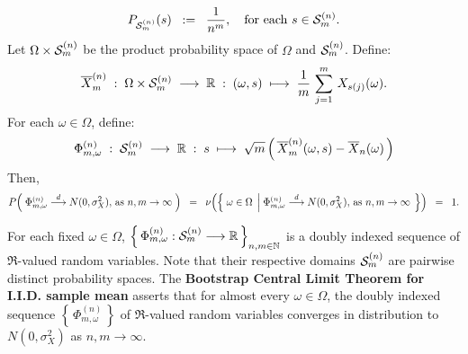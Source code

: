 \begin{theorem}
\begin{equation*}
P_{\mathcal{S}^{(n)}_{m}}(s) \;\; := \;\; \dfrac{1}{n^{m}},
\quad\textnormal{for each $s \in \mathcal{S}^{(n)}_{m}$}.
\end{equation*}
Let $\Omega \times \mathcal{S}^{(n)}_{m}$ be the product probability space of $\Omega$ and $\mathcal{S}^{(n)}_{m}$.
Define:
\begin{equation*}
\overline{X}^{(n)}_{m}
\;:\;\Omega \times \mathcal{S}^{(n)}_{m} \;\longrightarrow \; \mathbb{R}
\;:\; (\omega,s) \; \longmapsto \; \dfrac{1}{m}\,\sum^{m}_{j=1}\,X_{s(j)}(\omega).
\end{equation*}
For each $\omega \in \Omega$, define:
\begin{equation*}
\Phi^{(n)}_{m,\omega}
\;:\;
\mathcal{S}^{(n)}_{m}\;\longrightarrow\; \mathbb{R}
\;:\;
s
\;\longmapsto\;
\sqrt{m}\left(\,\overline{X}^{(n)}_{m}(\omega,s) - \overline{X}_{n}(\omega)\,\right)
\end{equation*}
Then,
\begin{equation*}
P\!\left(\;
\Phi^{(n)}_{m,\omega} \overset{d}{\longrightarrow} N(0,\sigma^{2}_{X}),\,\textnormal{as $n,m\rightarrow\infty$}
\;\right)
\;\; = \;\;
\nu\!\left(\left\{\;
\omega \in \Omega
\;\left\vert\;
\Phi^{(n)}_{m,\omega} \overset{d}{\longrightarrow} N(0,\sigma^{2}_{X}),\,\textnormal{as $n,m\rightarrow\infty$}
\right.
\;\right\}\right)
\;\; = \;\;
1.
\end{equation*}
\end{theorem}

\begin{remark}
\mbox{}\vskip 0.1cm
\noindent
For each fixed $\omega \in \Omega$,
$\left\{\,\Phi^{(n)}_{m,\omega} : \mathcal{S}^{(n)}_{m} \longrightarrow \mathbb{R}\,\right\}_{n,m\in\mathbb{N}}$
is a doubly indexed sequence of $\Re$-valued random variables.
Note that their respective domains $\mathcal{S}^{(n)}_{m}$ are pairwise distinct probability spaces.
The \textbf{Bootstrap Central Limit Theorem for I.I.D. sample mean}
asserts that for almost every $\omega \in \Omega$,
the doubly indexed sequence $\left\{\,\Phi^{(n)}_{m,\omega}\,\right\}$
of $\Re$-valued random variables converges in distribution to
$N(0,\sigma^{2}_{X})$ as $n, m \longrightarrow \infty$.
\end{remark}

